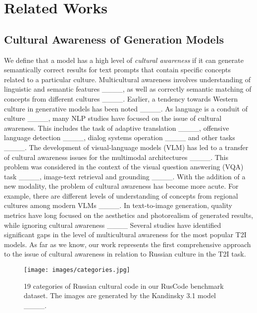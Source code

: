 \section{Related Works}
\subsection{Cultural Awareness of Generation Models}

We define that a model has a high level of \textit{cultural awareness} if it can generate semantically correct results for text prompts that contain specific concepts related to a particular culture. Multicultural awareness involves understanding of linguistic and semantic features ____, as well as correctly semantic matching of concepts from different cultures ____. Earlier, a tendency towards Western culture in generative models has been noted ____. As language is a conduit of culture ____, many NLP studies have focused on the issue of cultural awareness. This includes the task of adaptive translation ____, offensive language detection ____, dialog systems operation ____ and other tasks ____. The development of visual-language models (VLM) has led to a transfer of cultural awareness issues for the multimodal architectures ____. This problem was considered in the context of the visual question answering (VQA) task ____, image-text retrieval and grounding ____. With the addition of a new modality, the problem of cultural awareness has become more acute. For example, there are different levels of understanding of concepts from regional cultures among modern VLMs ____. 
In text-to-image generation, quality metrics have long focused on the aesthetics and photorealism of generated results, while ignoring cultural awareness ____ Several studies have identified significant gaps in the level of multicultural awareness for the most popular T2I models. As far as we know, our work represents the first comprehensive approach to the issue of cultural awareness in relation to Russian culture in the T2I task.

\begin{figure*}[t]
\texttt{[image: images/categories.jpg]}
  \caption{19 categories of Russian cultural code in our RusCode benchmark dataset. The images are generated by the Kandinsky 3.1 model ____.}
  \label{fig:categories}
\end{figure*}

